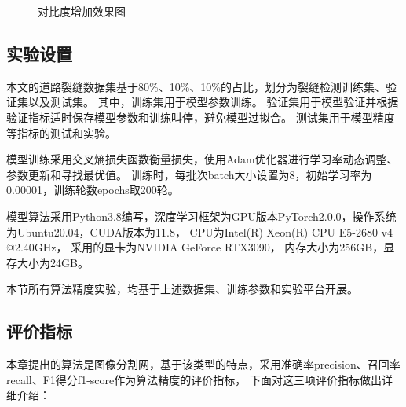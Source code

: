 \begin{figure}[H]
\caption{对比度增加效果图}
\label{contrast}
\end{figure}


\subsection{实验设置}
本文的道路裂缝数据集基于80\%、10\%、10\%的占比，划分为裂缝检测训练集、验证集以及测试集。
其中，训练集用于模型参数训练。
验证集用于模型验证并根据验证指标适时保存模型参数和训练叫停，避免模型过拟合。
测试集用于模型精度等指标的测试和实验。

模型训练采用交叉熵损失函数衡量损失，使用Adam优化器进行学习率动态调整、参数更新和寻找最优值。
训练时，每批次batch大小设置为8，初始学习率为0.00001，训练轮数epochs取200轮。

模型算法采用Python3.8编写，深度学习框架为GPU版本PyTorch2.0.0，操作系统为Ubuntu20.04，CUDA版本为11.8，
CPU为Intel(R) Xeon(R) CPU E5-2680 v4 @2.40GHz，
采用的显卡为NVIDIA GeForce RTX3090，
内存大小为256GB，显存大小为24GB。

本节所有算法精度实验，均基于上述数据集、训练参数和实验平台开展。

\subsection{评价指标}
本章提出的算法是图像分割网，基于该类型的特点，采用准确率precision、召回率recall、F1得分f1-score作为算法精度的评价指标，
下面对这三项评价指标做出详细介绍：

